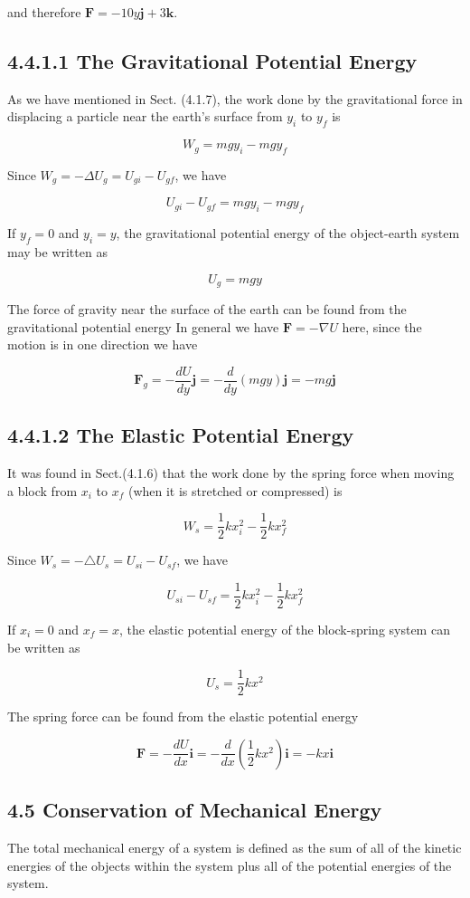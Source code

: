 \documentclass[10pt]{article}
\begin{document}
and therefore $\mathbf{F}=-10 y \mathbf{j}+3 \mathbf{k}$.

\subsection*{4.4.1.1 The Gravitational Potential Energy}
As we have mentioned in Sect. (4.1.7), the work done by the gravitational force in displacing a particle near the earth's surface from $y_{i}$ to $y_{f}$ is

$$
W_{g}=m g y_{i}-m g y_{f}
$$

Since $W_{g}=-\Delta U_{g}=U_{g i}-U_{g f}$, we have

$$
U_{g i}-U_{g f}=m g y_{i}-m g y_{f}
$$

If $y_{f}=0$ and $y_{i}=y$, the gravitational potential energy of the object-earth system may be written as

$$
U_{g}=m g y
$$

The force of gravity near the surface of the earth can be found from the gravitational potential energy In general we have $\mathbf{F}=-\nabla U$ here, since the motion is in one direction we have

$$
\mathbf{F}_{g}=-\frac{d U}{d y} \mathbf{j}=-\frac{d}{d y}(m g y) \mathbf{j}=-m g \mathbf{j}
$$

\subsection*{4.4.1.2 The Elastic Potential Energy}
It was found in Sect.(4.1.6) that the work done by the spring force when moving a block from $x_{i}$ to $x_{f}$ (when it is stretched or compressed) is

$$
W_{s}=\frac{1}{2} k x_{i}^{2}-\frac{1}{2} k x_{f}^{2}
$$

Since $W_{s}=-\triangle U_{s}=U_{s i}-U_{s f}$, we have

$$
U_{s i}-U_{s f}=\frac{1}{2} k x_{i}^{2}-\frac{1}{2} k x_{f}^{2}
$$

If $x_{i}=0$ and $x_{f}=x$, the elastic potential energy of the block-spring system can be written as

$$
U_{s}=\frac{1}{2} k x^{2}
$$

The spring force can be found from the elastic potential energy

$$
\mathbf{F}=-\frac{d U}{d x} \mathbf{i}=-\frac{d}{d x}\left(\frac{1}{2} k x^{2}\right) \mathbf{i}=-k x \mathbf{i}
$$

\subsection*{4.5 Conservation of Mechanical Energy}
The total mechanical energy of a system is defined as the sum of all of the kinetic energies of the objects within the system plus all of the potential energies of the system.
\end{document}
